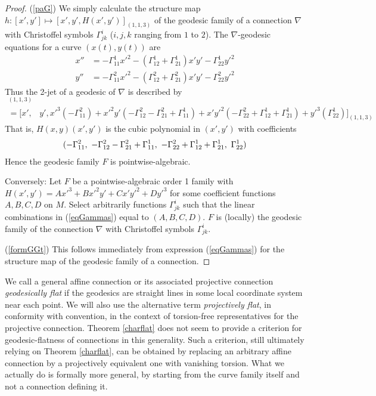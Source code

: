 \documentclass[12pt]{article}
\numberwithin{equation}{section}
\theoremstyle{plain}
\theoremstyle{definition}
\begin{document}
\begin{proof} (\ref{paG}) We simply calculate the structure map $h:[x',y']\mapsto[x',y',H(x',y')]_{(1,1,3)}$ of the geodesic family of a connection $\nabla$ with Christoffel symbols $\Gamma^{i}_{jk}$ ($i,j,k$ ranging from $1$ to $2$). The $\nabla$-geodesic equations for a curve $(x(t),y(t))$ are
\begin{align*}
x'' &= -\Gamma^{1}_{11}x'^{2}-(\Gamma^{1}_{12}+\Gamma^{1}_{21})x'y'-\Gamma^{1}_{22}y'^{2}\\
y'' &= -\Gamma^{2}_{11}x'^{2}-(\Gamma^{2}_{12}+\Gamma^{2}_{21})x'y'-\Gamma^{2}_{22}y'^{2}
\end{align*}
Thus the 2-jet of a geodesic of $\nabla$ is described by 
\begin{align*}
[x',&y',x'(-\Gamma^{2}_{11}x'^{2}-(\Gamma^{2}_{12}+\Gamma^{2}_{21})x'y'-\Gamma^{2}_{22}y'^{2})-y'(-\Gamma^{1}_{11}x'^{2}-(\Gamma^{1}_{12}+\Gamma^{1}_{21})x'y'-\Gamma^{1}_{22}y'^{2})]_{(1,1,3)}\\
=[x',&y',x'^{3}(-\Gamma^{2}_{11})+x'^{2}y'(-\Gamma^{2}_{12}-\Gamma^{2}_{21} +\Gamma^{1}_{11})+x'y'^{2}(-\Gamma^{2}_{22}+\Gamma^{1}_{12} +\Gamma^{1}_{21} )+y'^{3}(\Gamma^{1}_{22})]_{(1,1,3)}
\end{align*}
That is, $H(x,y)(x',y')$ is the cubic polynomial in $(x',y')$ with coefficients
\begin{align}\label{eqGammas}
(-\Gamma^{2}_{11},\thinspace\thinspace-\Gamma^{2}_{12}-\Gamma^{2}_{21} +\Gamma^{1}_{11},\thinspace\thinspace-\Gamma^{2}_{22}+\Gamma^{1}_{12} +\Gamma^{1}_{21},\thinspace\thinspace\Gamma^{1}_{22}) 
\end{align}
Hence the geodesic family $F$ is pointwise-algebraic.

Conversely: Let $F$ be a pointwise-algebraic order 1 family with $H(x',y')=Ax'^{3}+Bx'^{2}y'+Cx'y'^{2}+Dy'^{3}$ for some coefficient functions $A,B,C,D$ on $M$. Select arbitrarily functions $\Gamma^{i}_{jk}$ such that the linear combinations in (\ref{eqGammas}) equal to $(A,B,C,D)$. $F$ is (locally) the geodesic family of the connection $\nabla$ with Christoffel symbols $\Gamma^{i}_{jk}$.

(\ref{formGGt}) This follows immediately from expression (\ref{eqGammas}) for the structure map of the geodesic family of a connection.
\end{proof}

We call a general affine connection or its associated projective connection \emph{geodesically flat} if the geodesics are straight lines in some local coordinate system near each point. We will also use the alternative term \emph{projectively flat}, in conformity with convention, in the context of torsion-free representatives for the projective connection. Theorem \ref{charflat} does not seem to provide a criterion for geodesic-flatness of connections in this generality. Such a criterion, still ultimately relying on Theorem \ref{charflat}, can be obtained by replacing an arbitrary affine connection by a projectively equivalent one with vanishing torsion. What we actually do is formally more general, by starting from the curve family itself and not a connection defining it.
\end{document}
